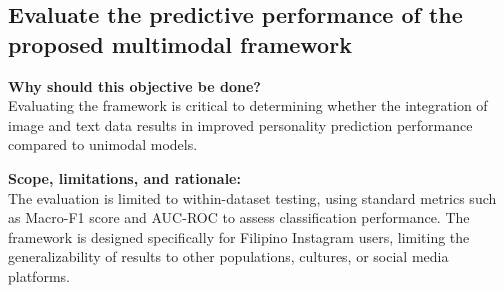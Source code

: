 	\subsection{Evaluate the predictive performance of the proposed multimodal framework}
	
	\textbf{Why should this objective be done?} \\
	Evaluating the framework is critical to determining whether the integration of image and text data results in improved personality prediction performance compared to unimodal models.
	
	\textbf{Scope, limitations, and rationale:} \\
	The evaluation is limited to within-dataset testing, using standard metrics such as Macro-F1 score and AUC-ROC to assess classification performance. The framework is designed specifically for Filipino Instagram users, limiting the generalizability of results to other populations, cultures, or social media platforms.
	






